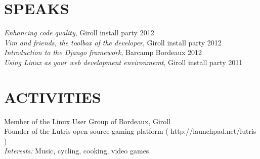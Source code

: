 \documentclass[margin]{res}
\begin{document}
\begin{resume}
\section{SPEAKS}
		{\sl Enhancing code quality}, Giroll install party \hfill     2012 \\
		{\sl Vim and friends, the toolbox of the developer}, Giroll install party \hfill     2012 \\
		{\sl Introduction to the Django framework}, Barcamp Bordeaux \hfill     2012 \\
		{\sl Using Linux as your web development environmemt}, Giroll install party \hfill     2011

\section{ACTIVITIES}
		Member of the Linux User Group of Bordeaux, Giroll \\
		Founder of the Lutris open source gaming platform ( http://launchpad.net/lutris )\\
		{\sl Interests:} Music, cycling, cooking, video games.


\end{resume}
\end{document}
